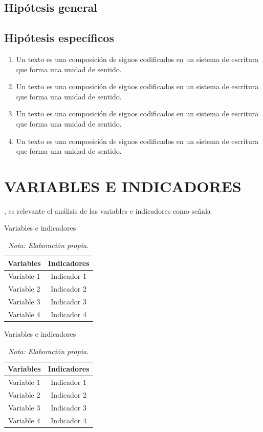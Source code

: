 \documentclass[12pt,a4paper]{article} %
\begin{document}
		\subsection{Hipótesis general}
			\lipsum[15]		
		\subsection{Hipótesis específicos}
			\begin{enumerate}
				\item Un texto es una composición de signos codificados en un sistema
				de escritura que forma una unidad de sentido.
				\item Un texto es una composición de signos codificados en un sistema
				de escritura que forma una unidad de sentido.
				\item Un texto es una composición de signos codificados en un sistema
				de escritura que forma una unidad de sentido.
				\item Un texto es una composición de signos codificados en un sistema
				de escritura que forma una unidad de sentido.
			\end{enumerate}
	\newpage
	\section{VARIABLES E INDICADORES}
	\lipsum[17], es relevante el análisis de las variables e indicadores como señala \cite{Carter-1958}
		\begin{table}[ht]
			\raggedright
			\caption{Variables e indicadores}
			\begin{tabular}{cc}
				\toprule
				Variables & Indicadores \\
				\midrule
				Variable 1 & Indicador 1\\
				Variable 2 & Indicador 2\\
				Variable 3 & Indicador 3\\
				Variable 4 & Indicador 4\\
				\bottomrule
			\end{tabular}
			\vspace{2mm}
			\caption*{\it Nota: Elaboración propia.}
			\label{tab: Variables e indicadores 1}
		\end{table}
		\lipsum[1]
		\begin{table}[ht]
			\raggedright
			\caption{Variables e indicadores}
				\begin{tabular}{cc}
					\toprule
					Variables & Indicadores \\
					\midrule
					Variable 1 & Indicador 1\\
					Variable 2 & Indicador 2\\
					Variable 3 & Indicador 3\\
					Variable 4 & Indicador 4\\
					\bottomrule
			\end{tabular}
			\vspace{2mm}
			\caption*{\it Nota: Elaboración propia.}
			\label{tab: Variables e indicadores 2}
		\end{table}	
	\newpage
\end{document}
